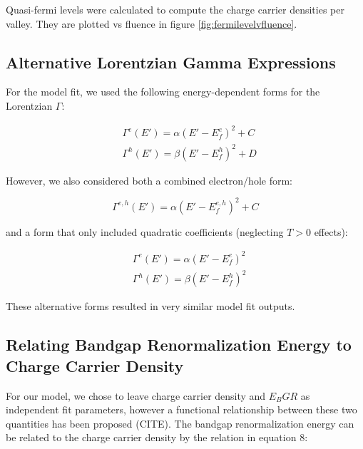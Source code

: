\documentclass[aps,prb,preprint,groupedaddress]{revtex4-2}
\begin{document}
Quasi-fermi levels were calculated to compute the charge carrier densities per valley. They are plotted vs fluence in figure \ref{fig:fermilevelvfluence}.

\subsection{Alternative Lorentzian Gamma Expressions}

For the model fit, we used the following energy-dependent forms for the Lorentzian $\Gamma$:

\begin{equation} \label{Gamma factor alternative 1}
	\begin{aligned}
	&\Gamma^{e}(E') = \alpha(E' - E_f^{e})^2 + C \\
	&\Gamma^{h}(E') = \beta(E' - E_f^{h})^2 + D
	\end{aligned}
\end{equation}

However, we also considered both a combined electron/hole form:

\begin{equation} \label{Gamma factor alternative 2}
\Gamma^{e,h}(E') = \alpha(E' - E_f^{e,h})^2 + C
\end{equation}

and a form that only included quadratic coefficients (neglecting $T > 0$ effects):

\begin{equation} \label{Gamma factor alternative 3}
	\begin{aligned}
	&\Gamma^{e}(E') = \alpha(E' - E_f^{e})^2 \\
	&\Gamma^{h}(E') = \beta(E' - E_f^{h})^2
	\end{aligned}
\end{equation}

These alternative forms resulted in very similar model fit outputs.


\subsection{Relating Bandgap Renormalization Energy to Charge Carrier Density}

For our model, we chose to leave charge carrier density and $E_BGR$ as independent fit parameters, however a functional relationship between these two quantities has been proposed (CITE). The bandgap renormalization energy can be related to the charge carrier density by the relation in equation 8:
\end{document}
